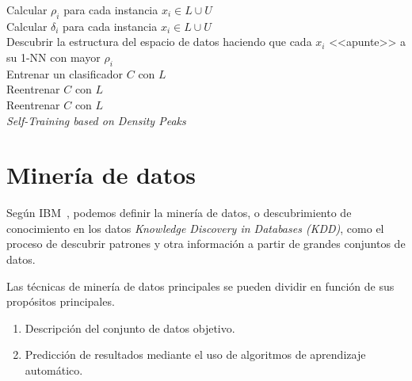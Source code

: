 \begin{algorithm}[H]
  	\BlankLine
	Calcular $\rho_i$ para cada instancia $x_i \in L \cup U$\\
	Calcular $\delta_i$ para cada instancia $x_i \in L \cup U$\\
	Descubrir la estructura del espacio de datos haciendo que cada $x_i$ <<apunte>> a su 1-NN con mayor $\rho_i$\\
	Entrenar un clasificador $C$ con $L$\\	
  	Reentrenar $C$ con $L$\\
 	Reentrenar $C$ con $L$\\
	\caption{\textit{Self-Training based on Density Peaks}}\label{alg:Wu-DensityPeaks}
\end{algorithm}


\clearpage
\section{Minería de datos}

Según IBM~\cite{IBM-WhatisDataMining}, podemos definir la minería de datos, o descubrimiento de conocimiento
en los datos \textit{Knowledge Discovery in Databases (KDD)}, como el proceso de descubrir patrones y otra
información a partir de grandes conjuntos de datos. 

Las técnicas de minería de datos principales se pueden dividir en función de sus propósitos principales.
\begin{enumerate}
    \item Descripción del conjunto de datos objetivo.
    \item Predicción de resultados mediante el uso de algoritmos de aprendizaje automático.
\end{enumerate}

